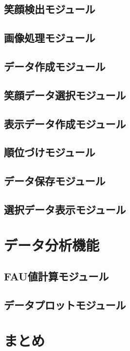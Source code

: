 \subsection{笑顔検出モジュール}
\subsection{画像処理モジュール}
\subsection{データ作成モジュール}
\subsection{笑顔データ選択モジュール}
\subsection{表示データ作成モジュール}
\subsection{順位づけモジュール}
\subsection{データ保存モジュール}
\subsection{選択データ表示モジュール}

\section{データ分析機能}
\subsection{FAU値計算モジュール}
\subsection{データプロットモジュール}
\section{まとめ}
